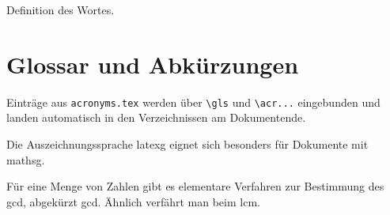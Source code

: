 \begin{vocabulary}[Wort]
	Definition des Wortes.
\end{vocabulary}


\section{Glossar und Abkürzungen}

Einträge aus \texttt{acronyms.tex} werden über \verb|\gls| und \verb|\acr...|
eingebunden und landen automatisch in den Verzeichnissen am Dokumentende.

Die Auszeichnungssprache \Gls{latexg} eignet sich besonders für Dokumente
mit \gls{mathsg}.

Für eine Menge von Zahlen gibt es elementare Verfahren zur Bestimmung des
\acrlong{gcd}, abgekürzt \acrshort{gcd}. Ähnlich verfährt man beim
\acrfull{lcm}.
